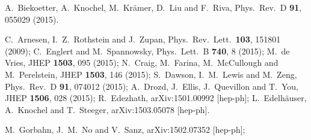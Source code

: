 
  A.~Biekoetter, A.~Knochel, M.~Kr\"amer, D.~Liu and F.~Riva,
  Phys.\ Rev.\ D {\bf 91}, 055029 (2015).

  C.~Arnesen, I.~Z.~Rothstein and J.~Zupan,
  Phys.\ Rev.\ Lett.\  {\bf 103}, 151801 (2009);
  C.~Englert and M.~Spannowsky,
  Phys.\ Lett.\ B {\bf 740}, 8 (2015);
  M.~de Vries,
  JHEP {\bf 1503}, 095 (2015);
  N.~Craig, M.~Farina, M.~McCullough and M.~Perelstein,
  JHEP {\bf 1503}, 146 (2015);
  S.~Dawson, I.~M.~Lewis and M.~Zeng,
  Phys.\ Rev.\ D {\bf 91}, 074012 (2015);
  A.~Drozd, J.~Ellis, J.~Quevillon and T.~You,
  JHEP {\bf 1506}, 028 (2015);
  R.~Edezhath,
  arXiv:1501.00992 [hep-ph];
  L.~Edelh\"auser, A.~Knochel and T.~Steeger,
  arXiv:1503.05078 [hep-ph].

  M.~Gorbahn, J.~M.~No and V.~Sanz,
  arXiv:1502.07352 [hep-ph];

